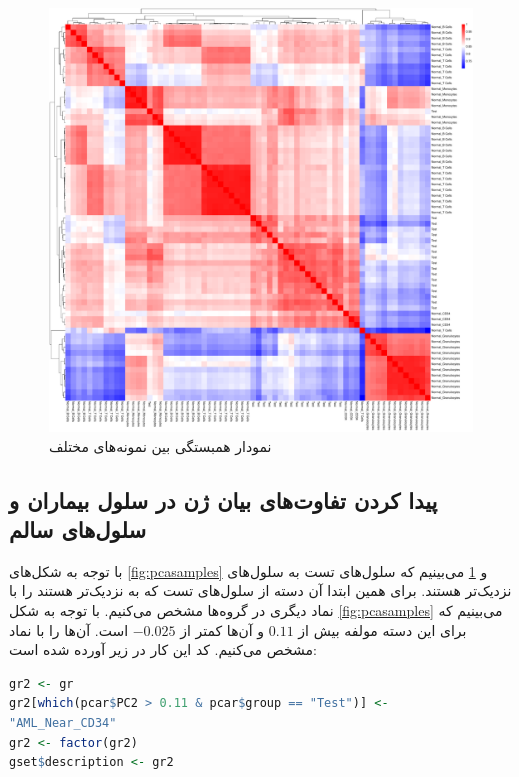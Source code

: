 \documentclass[12pt]{article}
\begin{document}
\begin{figure}[h!]
	\centering	
	\includegraphics[width = 1.1 \textwidth ]{./Results/CorHeatmap.pdf}
	\caption{نمودار  همبستگی بین نمونه‌های مختلف}
	\label{fig:heat}
\end{figure}


\newpage

\subsection{پیدا کردن تفاوت‌های بیان ژن در سلول بیماران و سلول‌های سالم}

با توجه به شکل‌های \ref{fig:pcasamples} و \ref{fig:heat} می‌بینیم که سلول‌های تست به سلول‌های  نزدیک‌‌تر هستند. برای همین ابتدا آن دسته از سلول‌های تست که به  نزدیک‌تر هستند را با نماد دیگری در گروه‌ها مشخص می‌کنیم. با توجه به شکل \ref{fig:pcasamples} می‌بینیم که برای این دسته مولفه  بیش از $0.11$ و  آن‌ها کمتر از $-0.025$ است. آن‌ها را با نماد
مشخص می‌کنیم. کد این کار در زیر آورده شده است:

\begin{latin}
\begin{lstlisting}[language=R]
gr2 <- gr
gr2[which(pcar$PC2 > 0.11 & pcar$group == "Test")] <-
"AML_Near_CD34"
gr2 <- factor(gr2)
gset$description <- gr2
\end{lstlisting}
\end{latin}
\end{document}
